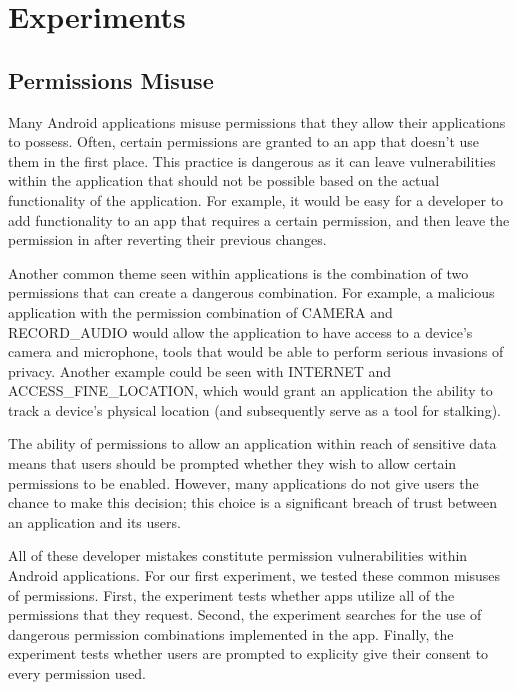 \section{Experiments}
\label{sec:design}

    \subsection{Permissions Misuse}
    
        Many Android applications misuse permissions that they
        allow their applications to possess. Often, certain
        permissions are granted to an app that doesn't use them
        in the first place. This practice is dangerous as it can 
        leave vulnerabilities within the application that should
        not be possible based on the actual functionality of the
        application. For example, it would be easy for a 
        developer to add functionality to an app that requires a
        certain permission, and then leave the permission in after
        reverting their previous changes. 
        
        Another common theme seen within applications
        is the combination of two permissions that can create a 
        dangerous combination. For example, a malicious 
        application with the permission combination of
        CAMERA and RECORD\_AUDIO would allow the application
        to have access to a device's camera and microphone, tools
        that would be able to perform serious invasions of privacy. 
        Another example could be seen with INTERNET and 
        ACCESS\_FINE\_LOCATION, which would grant an application the
        ability to track a device's physical location (and 
        subsequently serve as a tool for stalking).

        The ability of permissions to allow an application within
        reach of sensitive data means that users should be prompted
        whether they wish to allow certain permissions to be enabled.
        However, many applications do not give users the chance to 
        make this decision; this choice is a significant breach of trust 
        between an application and its users.

        All of these developer mistakes constitute permission vulnerabilities
        within Android applications. For our first experiment, we
        tested these common misuses of permissions. First, 
        the experiment tests whether apps utilize all of the
        permissions that they request. Second, the experiment 
        searches for the use of dangerous permission combinations
        implemented in the app. Finally, the experiment tests whether
        users are prompted to explicity give their consent to every
        permission used.
        
